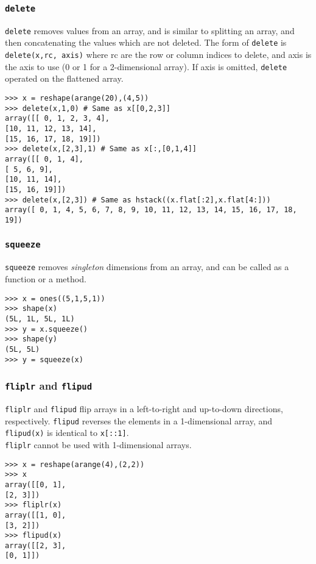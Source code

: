 \documentclass[Pydata.tex]{subfiles}
\begin{document}
\subsubsection*{\texttt{delete}}
\texttt{delete} removes values from an array, and is similar to splitting an array, and then concatenating the values
which are not deleted. The form of \texttt{delete} is \texttt{delete(x,rc, axis)} where rc are the row or column indices to
delete, and axis is the axis to use (0 or 1 for a 2-dimensional array). If axis is omitted, \texttt{delete} operated on
the flattened array.
\begin{framed}
\begin{verbatim}
>>> x = reshape(arange(20),(4,5))
>>> delete(x,1,0) # Same as x[[0,2,3]]
array([[ 0, 1, 2, 3, 4],
[10, 11, 12, 13, 14],
[15, 16, 17, 18, 19]])
>>> delete(x,[2,3],1) # Same as x[:,[0,1,4]]
array([[ 0, 1, 4],
[ 5, 6, 9],
[10, 11, 14],
[15, 16, 19]])
>>> delete(x,[2,3]) # Same as hstack((x.flat[:2],x.flat[4:]))
array([ 0, 1, 4, 5, 6, 7, 8, 9, 10, 11, 12, 13, 14, 15, 16, 17, 18,
19])
\end{verbatim}
\end{framed}
\subsubsection*{\texttt{squeeze}}
\texttt{squeeze} removes \textit{singleton} dimensions from an array, and can be called as a function or a method.
\begin{framed}
\begin{verbatim}
>>> x = ones((5,1,5,1))
>>> shape(x)
(5L, 1L, 5L, 1L)
>>> y = x.squeeze()
>>> shape(y)
(5L, 5L)
>>> y = squeeze(x)
\end{verbatim}
\end{framed}
\subsubsection*{\texttt{fliplr} and \texttt{flipud}}
\texttt{fliplr} and \texttt{flipud} flip arrays in a left-to-right and up-to-down directions, respectively. \texttt{flipud} reverses
the elements in a 1-dimensional array, and \texttt{flipud(x)} is identical to \texttt{x[::1]}.\\
\texttt{fliplr} cannot be used with 1-dimensional arrays.
\begin{framed}
\begin{verbatim}
>>> x = reshape(arange(4),(2,2))
>>> x
array([[0, 1],
[2, 3]])
>>> fliplr(x)
array([[1, 0],
[3, 2]])
>>> flipud(x)
array([[2, 3],
[0, 1]])
\end{verbatim}
\end{framed}
\end{document}
